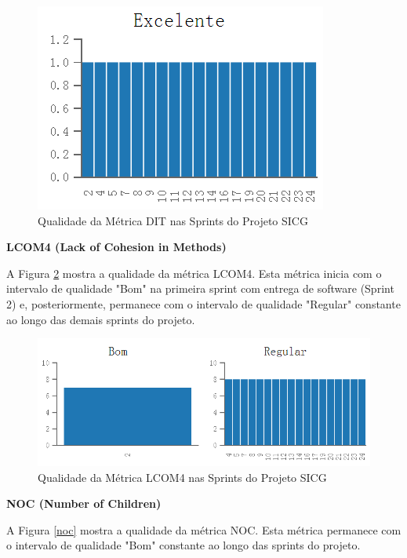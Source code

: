 \begin{figure}[H]
		\centering
			\includegraphics[scale=1.0]{figuras/dit.png}
		\caption{Qualidade da Métrica DIT nas Sprints do Projeto SICG}
		\label{dit}
\end{figure}


\textbf{LCOM4 (Lack of Cohesion in Methods)} 

A Figura \ref{lcom4} mostra a qualidade da métrica LCOM4. Esta métrica inicia com o intervalo de qualidade "Bom" na primeira sprint com entrega de software (Sprint 2) e, posteriormente, permanece com o intervalo de qualidade "Regular" constante ao longo das demais sprints do projeto.

\begin{figure}[H]
		\centering
			\includegraphics[scale=0.9]{figuras/lcom4.png}
		\caption{Qualidade da Métrica LCOM4  nas Sprints do Projeto SICG}
		\label{lcom4}
\end{figure}

\textbf{NOC (Number of Children)}

A Figura \ref{noc} mostra a qualidade da métrica NOC. Esta métrica permanece com o intervalo de qualidade "Bom" constante ao longo das sprints do projeto.

